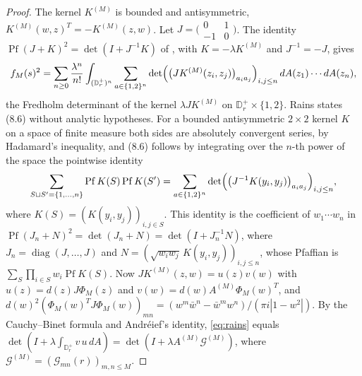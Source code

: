 \documentclass[11pt]{amsart}
\theoremstyle{definition}
\theoremstyle{remark}
\numberwithin{equation}{section}
\newcommand{\D}{\mathbb{D}}
\begin{document}
\begin{proof}
The kernel $K^{(M)}$ is bounded and antisymmetric, $K^{(M)}(w,z)^T=-K^{(M)}(z,w)$. Let $J=\bigl(\begin{smallmatrix}0&1\\-1&0\end{smallmatrix}\bigr)$. The identity $\operatorname{Pf}(J+K)^2=\det(I+J^{-1}K)$ of \cite[Lemma~8.1, (8.6)]{Ra}, with $K=-\lambda K^{(M)}$ and $J^{-1}=-J$, gives
\begin{equation}\label{eq:rains}
f_M(s)^2=\sum_{n\ge0}\frac{\lambda^n}{n!}\int_{(\D_r^+)^n}\sum_{a\in\{1,2\}^n}\det\Bigl(\bigl(JK^{(M)}(z_i,z_j)\bigr)_{a_ia_j}\Bigr)_{i,j\le n}\,dA(z_1)\cdots dA(z_n),
\end{equation}
the Fredholm determinant of the kernel $\lambda JK^{(M)}$ on $\D_r^+\times\{1,2\}$. Rains states (8.6) without analytic hypotheses. For a bounded antisymmetric $2\times2$ kernel $K$ on a space of finite measure both sides are absolutely convergent series, by Hadamard's inequality, and (8.6) follows by integrating over the $n$-th power of the space the pointwise identity
\[
\sum_{S\sqcup S'=\{1,\dots,n\}}\operatorname{Pf}K(S)\operatorname{Pf}K(S')=\sum_{a\in\{1,2\}^n}\det\Bigl(\bigl(J^{-1}K(y_i,y_j)\bigr)_{a_ia_j}\Bigr)_{i,j\le n},
\]
where $K(S)=(K(y_i,y_j))_{i,j\in S}$. This identity is the coefficient of $w_1\cdots w_n$ in $\operatorname{Pf}(J_n+N)^2=\det(J_n+N)=\det(I+J_n^{-1}N)$, where $J_n=\operatorname{diag}(J,\dots,J)$ and $N=(\sqrt{w_iw_j}\,K(y_i,y_j))_{i,j\le n}$, whose Pfaffian is $\sum_{S}\prod_{i\in S}w_i\operatorname{Pf}K(S)$. Now $JK^{(M)}(z,w)=u(z)v(w)$ with $u(z)=d(z)J\Phi_M(z)$ and $v(w)=d(w)A^{(M)}\Phi_M(w)^T$, and $d(w)^2(\Phi_M(w)^TJ\Phi_M(w))_{mn}=(w^m\bar w^n-\bar w^mw^n)/(\pi i|1-w^2|)$. By the Cauchy--Binet formula and Andr\'eief's identity, \eqref{eq:rains} equals $\det(I+\lambda\int_{\D_r^+}v\,u\,dA)=\det(I+\lambda A^{(M)}\mathcal G^{(M)})$, where $\mathcal G^{(M)}=(\mathcal G_{mn}(r))_{m,n\le M}$.


\end{proof}
\end{document}
